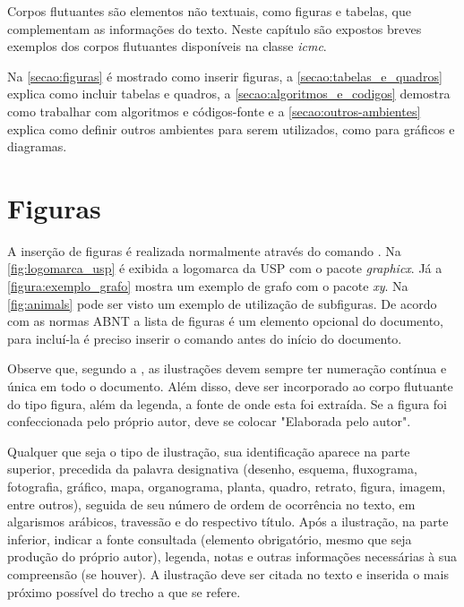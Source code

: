 
Corpos flutuantes são elementos não textuais, como figuras e tabelas, que complementam as informações do texto. Neste capítulo são expostos breves exemplos dos corpos flutuantes disponíveis na classe \textit{icmc}.

Na \autoref{secao:figuras} é mostrado como inserir figuras, a \autoref{secao:tabelas_e_quadros} explica como incluir tabelas e quadros, a \autoref{secao:algoritmos_e_codigos} demostra como trabalhar com algoritmos e códigos-fonte e a \autoref{secao:outros-ambientes} explica como definir outros ambientes para serem utilizados, como para gráficos e diagramas.

\section{Figuras}
\label{secao:figuras}

A inserção de figuras é realizada normalmente através do comando . Na \autoref{fig:logomarca_usp} é exibida a logomarca da USP com o pacote \textit{graphicx}. Já a \autoref{figura:exemplo_grafo} mostra um exemplo de grafo com o pacote \textit{xy}. Na \autoref{fig:animals} pode ser visto um exemplo de utilização de subfiguras. De acordo com as normas ABNT a lista de figuras é um elemento opcional do documento, para incluí-la é preciso inserir o comando  antes do início do documento.

Observe que, segundo a , as
ilustrações devem sempre ter numeração contínua e única em todo o documento. Além disso, deve ser incorporado ao corpo flutuante do tipo figura, além da legenda, a fonte de onde esta foi extraída. Se a figura foi confeccionada pelo próprio autor, deve se colocar "Elaborada pelo autor".

\begin{citacao}
Qualquer que seja o tipo de ilustração, sua identificação aparece na parte
superior, precedida da palavra designativa (desenho, esquema, fluxograma,
fotografia, gráfico, mapa, organograma, planta, quadro, retrato, figura,
imagem, entre outros), seguida de seu número de ordem de ocorrência no texto,
em algarismos arábicos, travessão e do respectivo título. Após a ilustração, na
parte inferior, indicar a fonte consultada (elemento obrigatório, mesmo que
seja produção do próprio autor), legenda, notas e outras informações
necessárias à sua compreensão (se houver). A ilustração deve ser citada no
texto e inserida o mais próximo possível do trecho a que se
refere. \cite[seções 5.8]{NBR14724:2011}
\end{citacao}

